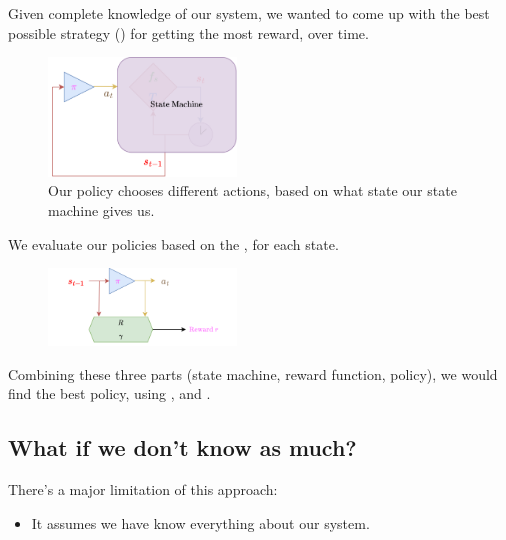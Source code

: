         Given complete knowledge of our system, we wanted to come up with the best possible strategy () for getting the most reward, over time.

        \begin{figure}[H]
            \centering
            \includegraphics[width=50mm,scale=0.5]{images/mdp_images/policy_statemachine.png}
            
            \caption*{Our policy chooses different actions, based on what state our state machine gives us.}
        \end{figure}

        We evaluate our policies based on the , for each state.

        \begin{figure}[H]
            \centering
            \includegraphics[width=50mm,scale=0.5]{images/mdp_images/policy_reward.png}
        \end{figure}

        Combining these three parts (state machine, reward function, policy), we would find the best policy, using , and .



    \phantom{}

    \subsection{What if we don't know as much?}

        There's a major limitation of this approach:

        \begin{itemize}
            \item It assumes we have know everything about our system.\\
        \end{itemize}

